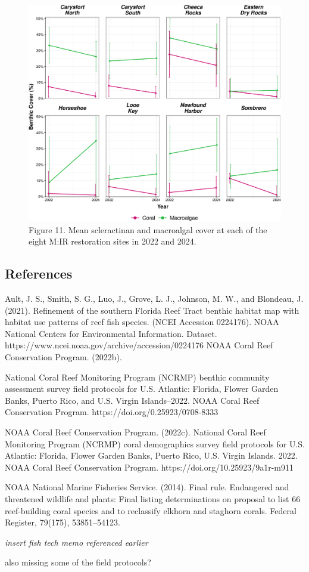 \documentclass[
]{article}
\begin{document}
\begin{figure}

{\centering \includegraphics{MIR_quarto_files/figure-pdf/zone_fig-1.pdf}

}

\caption{Figure 11. Mean scleractinan and macroalgal cover at each of
the eight M:IR restoration sites in 2022 and 2024.}

\end{figure}

\hypertarget{references}{%
\subsection{\texorpdfstring{\textbf{References}}{References}}\label{references}}

Ault, J. S., Smith, S. G., Luo, J., Grove, L. J., Johnson, M. W., and
Blondeau, J. (2021). Refinement of the southern Florida Reef Tract
benthic habitat map with habitat use patterns of reef fish species.
(NCEI Accession 0224176). NOAA National Centers for Environmental
Information. Dataset.
https://www.ncei.noaa.gov/archive/accession/0224176 NOAA Coral Reef
Conservation Program. (2022b).

National Coral Reef Monitoring Program (NCRMP) benthic community
assessment survey field protocols for U.S. Atlantic: Florida, Flower
Garden Banks, Puerto Rico, and U.S. Virgin Islands--2022. NOAA Coral
Reef Conservation Program. https://doi.org/0.25923/0708-8333

NOAA Coral Reef Conservation Program. (2022c). National Coral Reef
Monitoring Program (NCRMP) coral demographics survey field protocols for
U.S. Atlantic: Florida, Flower Garden Banks, Puerto Rico, U.S. Virgin
Islands. 2022. NOAA Coral Reef Conservation Program.
https://doi.org/10.25923/9a1r-m911

NOAA National Marine Fisheries Service. (2014). Final rule. Endangered
and threatened wildlife and plants: Final listing determinations on
proposal to list 66 reef-building coral species and to reclassify
elkhorn and staghorn corals. Federal Register, 79(175), 53851--54123.

\emph{insert fish tech memo referenced earlier}

also missing some of the field protocols?
\end{document}
